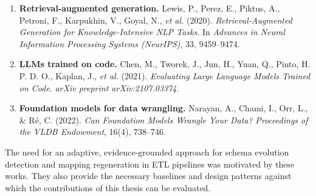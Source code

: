 \begin{blankpage}
\begin{enumerate}
        \item \textbf{Retrieval-augmented generation.}  
        Lewis, P., Perez, E., Piktus, A., Petroni, F., Karpukhin, V., Goyal, N., \emph{et al.} (2020). \emph{Retrieval-Augmented Generation for Knowledge-Intensive NLP Tasks}. In \emph{Advances in Neural Information Processing Systems (NeurIPS)}, 33, 9459--9474.

        \item \textbf{LLMs trained on code.}  
        Chen, M., Tworek, J., Jun, H., Yuan, Q., Pinto, H. P. D. O., Kaplan, J., \emph{et al.} (2021). \emph{Evaluating Large Language Models Trained on Code}. \emph{arXiv preprint arXiv:2107.03374}.

        \item \textbf{Foundation models for data wrangling.}  
        Narayan, A., Chami, I., Orr, L., \& R{\'e}, C. (2022). \emph{Can Foundation Models Wrangle Your Data?} \emph{Proceedings of the VLDB Endowment}, 16(4), 738--746.
    \end{enumerate}

    \vspace{0.5cm}

    \noindent The need for an adaptive, evidence-grounded approach for schema evolution detection and mapping regeneration in ETL pipelines was motivated by these works. They also provide the necessary baselines and design patterns against which the contributions of this thesis can be evaluated.

\end{blankpage}

